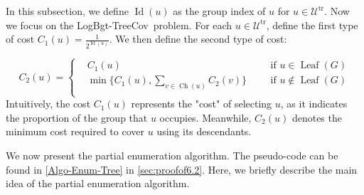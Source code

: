 \documentclass[11pt,a4paper]{article} \usepackage{enumitem}
\newcommand{\calU}{\mathcal{U}}
\newcommand{\LBOtreecov}{\textsf{LogBgt-TreeCov}}
\newcommand{\trU}{\operatorname{\calU^{tr}}}
\newcommand{\Ch}{\operatorname{Ch}}
\newcommand{\Leaf}{\operatorname{Leaf}}
\newcommand{\Lev}{\operatorname{Id}}
\theoremstyle{definition}
\begin{document}
In this subsection, we define $\Lev(u)$ as the group index of $u$ for $u\in \trU$.
Now we focus on the \LBOtreecov\ problem. 
For each $u \in \trU$, define the first type of cost $C_1(u) = \frac{1}{2^{\Lev(u)}}$. We then define the second type of cost:

$$
C_2(u)=\left\lbrace \begin{aligned}
&C_1(u) && & \text{if $u\in \Leaf(G)$}\\
&\min \lbrace C_1(u),\sum_{v\in \Ch(u)} C_2(v)\rbrace&& & \text{if $u\not \in \Leaf(G)$}\\
\end{aligned}\right.
$$
Intuitively, the cost $C_1(u)$ represents the "cost" of selecting $u$, as it indicates the proportion of the group that $u$ occupies.
Meanwhile, $C_2(u)$ denotes the minimum cost required to cover $u$ using its descendants.


We now present the partial enumeration algorithm. The pseudo-code can be found in \cref{Algo-Enum-Tree} in \cref{sec:proofof6.2}. Here, we briefly describe the main idea of the partial enumeration algorithm.
\end{document}
